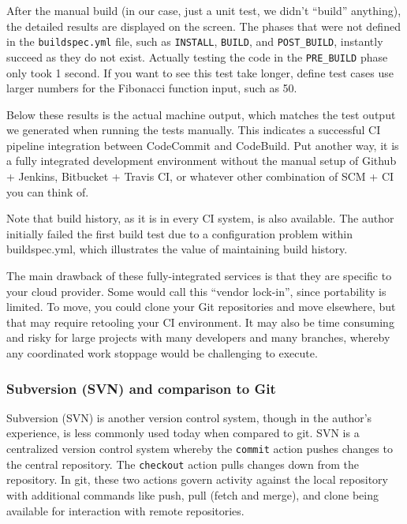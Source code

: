 After the manual build (in our case, just a unit test, we didn't ``build''
anything), the detailed results are displayed on the screen. The phases that
were not defined in the \verb|buildspec.yml| file, such as \verb|INSTALL|,
\verb|BUILD|, and \verb|POST_BUILD|, instantly succeed as they do not exist.
Actually testing the code in the \verb|PRE_BUILD| phase only took 1 second.
If you want to see this test take longer, define test cases use larger numbers
for the Fibonacci function input, such as 50.


Below these results is the actual machine output, which matches the test
output we generated when running the tests manually. This indicates a
successful CI pipeline integration between CodeCommit and CodeBuild. Put
another way, it is a fully integrated development environment without the
manual setup of Github + Jenkins, Bitbucket + Travis CI, or whatever other
combination of SCM + CI you can think of.


Note that build history, as it is in every CI system, is also available. The
author initially failed the first build test due to a configuration problem
within buildspec.yml, which illustrates the value of maintaining build
history.


The main drawback of these fully-integrated services is that they are specific
to your cloud provider. Some would call this ``vendor lock-in'', since
portability is limited. To move, you could clone your Git repositories and
move elsewhere, but that may require retooling your CI environment. It may
also be time consuming and risky for large projects with many developers and
many branches, whereby any coordinated work stoppage would be challenging to execute.

\subsubsection{Subversion (SVN) and comparison to Git}
Subversion (SVN) is another version control system, though in the author's
experience, is less commonly used today when compared to git. SVN is a
centralized version control system whereby the \verb|commit| action pushes
changes to the central repository. The \verb|checkout| action pulls changes
down from the repository. In git, these two actions govern activity against
the local repository with additional commands like push, pull (fetch and
merge), and clone being available for interaction with remote repositories.

